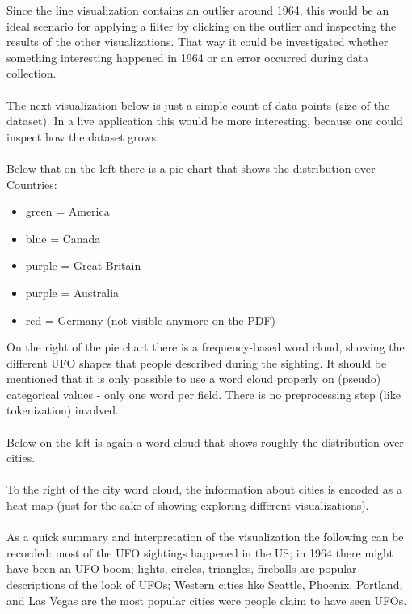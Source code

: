 \documentclass[bibliography=totoc]{article}
\begin{document}
Since the line visualization contains an outlier around 1964, this would
be an ideal scenario for applying a filter by clicking on the outlier and inspecting the results of the other
visualizations. That way
it could be investigated whether something interesting happened in 1964 or
an error occurred during data collection.
\\
\\
The next visualization below is just a simple count of data points (size of the dataset). 
In a live application this would be more interesting, because one could inspect how the 
dataset grows.
\\
\\
Below that on the left there is a pie chart that shows the distribution over Countries:
\begin{itemize}
  \item green = America
  \item blue = Canada
  \item purple = Great Britain
  \item purple = Australia
  \item red = Germany (not visible anymore on the PDF)
\end{itemize}

On the right of the pie chart there is a frequency-based word cloud, showing the different UFO shapes that 
people described during the sighting. It should be mentioned that it is only possible to
use a word cloud properly on (pseudo) categorical values - only one word per field.
There is no preprocessing step
(like tokenization) involved.
\\
\\
Below on the left is again a word cloud that shows roughly the distribution over cities.
\\
\\
To the right of the city word cloud, the information about cities is encoded as a 
heat map (just for the sake of showing exploring different visualizations).
\\
\\
As a quick summary and interpretation of the visualization the following can 
be recorded: most of the UFO sightings happened in the US; in 1964 there might have been 
an UFO boom; lights, circles, triangles, fireballs are popular descriptions of the look of UFOs;
Western cities like Seattle, Phoenix, Portland, and Las Vegas are the most popular cities were people claim
to have seen UFOs.
\end{document}
